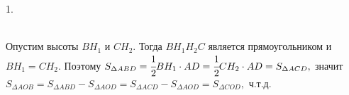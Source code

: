 1. \begin{figure}[ht!]
\end{figure}\\
Опустим высоты $BH_1$ и $CH_2.$ Тогда $BH_1H_2C$ является прямоугольником и $BH_1=CH_2.$ Поэтому $S_{\Delta ABD}=\cfrac{1}{2}BH_1\cdot AD=\cfrac{1}{2}CH_2\cdot AD=S_{\Delta ACD},$ значит $S_{\Delta AOB}=S_{\Delta ABD}-S_{\Delta AOD}=S_{\Delta ACD}-S_{\Delta AOD}=S_{\Delta COD},$ ч.т.д.\\
